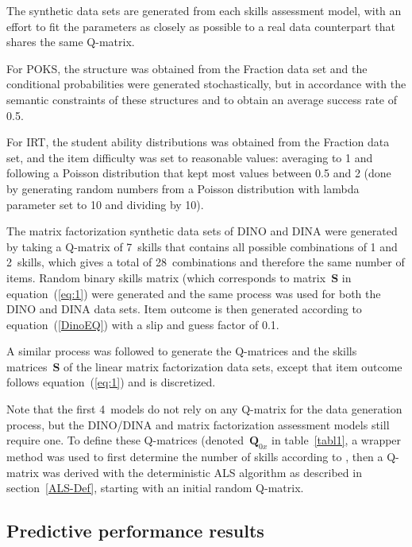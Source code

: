 The synthetic data sets are generated from each skills assessment model, with an effort to fit the parameters as closely as possible to a real data counterpart that shares the same Q-matrix.  

For POKS, the structure was obtained from the Fraction data set and the conditional probabilities were generated stochastically, but in accordance with the semantic constraints of these structures and to obtain an average success rate of 0.5.

For IRT, the student ability distributions was obtained from the Fraction data set, and the item difficulty was set to reasonable values: averaging to 1 and following a Poisson distribution that kept most values between 0.5 and 2 (done by generating random numbers from a Poisson distribution with lambda parameter set to 10 and dividing by 10). 

The matrix factorization synthetic data sets of DINO and DINA were generated by taking a Q-matrix of 7~skills that contains all possible combinations of 1 and 2~skills, which gives a total of 28~combinations and therefore the same number of items.  Random binary skills matrix (which corresponds to matrix~$\mathbf{S}$ in equation~(\ref{eq:1}) were generated and the same process was used for both the DINO and DINA data sets.  Item outcome is then generated according to equation~(\ref{DinoEQ}) with a slip and guess factor of 0.1.

A similar process was followed to generate the Q-matrices and the skills matrices~$\mathbf{S}$ of the linear matrix factorization data sets, except that item outcome follows equation~(\ref{eq:1}) and is discretized.


Note that the first 4~models do not rely on any Q-matrix for the data generation process, but the DINO/DINA and matrix factorization assessment models still require one.  To define these Q-matrices (denoted~$\mathbf{Q}_{0x}$ in table~\ref{tabl1}, a wrapper method was used to first determine the number of skills according to \citep{Beheshti2012Numbers}, then a Q-matrix was derived with the deterministic ALS algorithm as described in section~\ref{ALS-Def}, starting with an initial random Q-matrix.



\subsection{Predictive performance results} \label{secSyn}


